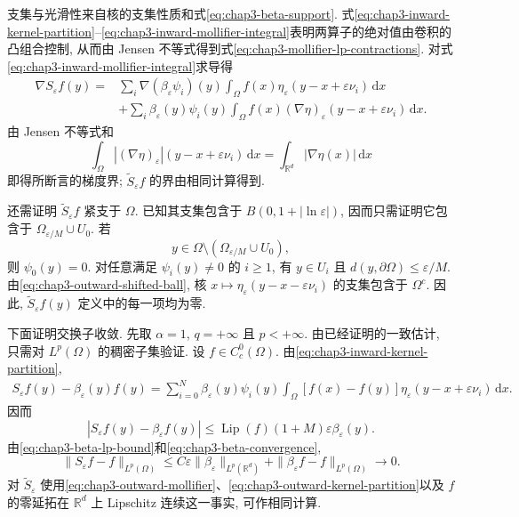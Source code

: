 \begin{Proof}
支集与光滑性来自核的支集性质和式\eqref{eq:chap3-beta-support}. 式\eqref{eq:chap3-inward-kernel-partition}--\eqref{eq:chap3-inward-mollifier-integral}表明两算子的绝对值由卷积的凸组合控制, 从而由 Jensen 不等式得到式\eqref{eq:chap3-mollifier-lp-contractions}. 对式\eqref{eq:chap3-inward-mollifier-integral}求导得
\begin{equation}
 \begin{split}
 \nabla S_\varepsilon f(y)={}&\sum_i\nabla(\beta_\varepsilon\psi_i)(y)
 \int_\Omega f(x)\eta_\varepsilon(y-x+\varepsilon\nu_i)\,\mathrm dx\\
 &+\sum_i\beta_\varepsilon(y)\psi_i(y)
 \int_\Omega f(x)(\nabla\eta)_\varepsilon(y-x+\varepsilon\nu_i)\,\mathrm dx.
 \end{split}
 \label{eq:chap3-mollifier-gradient}
\end{equation}
由 Jensen 不等式和
\[
 \int_\Omega|(\nabla\eta)_\varepsilon|(y-x+\varepsilon\nu_i)\,\mathrm dx
 =\int_{\mathbb R^d}|\nabla\eta(x)|\,\mathrm dx
\]
即得所断言的梯度界; $\widetilde S_\varepsilon f$ 的界由相同计算得到.

还需证明 $\widetilde S_\varepsilon f$ 紧支于 $\Omega$. 已知其支集包含于 $B(0,1+|\ln\varepsilon|)$, 因而只需证明它包含于 $\Omega_{\varepsilon/M}\cup U_0$. 若
\[
 y\in\Omega\setminus(\Omega_{\varepsilon/M}\cup U_0),
\]
则 $\psi_0(y)=0$. 对任意满足 $\psi_i(y)\neq0$ 的 $i\geq1$, 有 $y\in U_i$ 且 $d(y,\partial\Omega)\leq\varepsilon/M$. 由\eqref{eq:chap3-outward-shifted-ball}, 核 $x\mapsto\eta_\varepsilon(y-x-\varepsilon\nu_i)$ 的支集包含于 $\Omega^c$. 因此, $\widetilde S_\varepsilon f(y)$ 定义中的每一项均为零.

下面证明交换子收敛. 先取 $\alpha=1$, $q=+\infty$ 且 $p<+\infty$. 由已经证明的一致估计, 只需对 $L^p(\Omega)$ 的稠密子集验证. 设 $f\in C_c^0(\Omega)$. 由\eqref{eq:chap3-inward-kernel-partition},
\[
\begin{aligned}
 S_\varepsilon f(y)-\beta_\varepsilon(y)f(y)
 =\sum_{i=0}^N\beta_\varepsilon(y)\psi_i(y)
 \int_\Omega[f(x)-f(y)]\eta_\varepsilon(y-x+\varepsilon\nu_i)\,\mathrm dx.
\end{aligned}
\]
因而
\[
 |S_\varepsilon f(y)-\beta_\varepsilon f(y)|
 \leq\operatorname{Lip}(f)(1+M)\varepsilon\beta_\varepsilon(y).
\]
由\eqref{eq:chap3-beta-lp-bound}和\eqref{eq:chap3-beta-convergence},
\[
 \|S_\varepsilon f-f\|_{L^p(\Omega)}
 \leq C\varepsilon\|\beta_\varepsilon\|_{L^p(\mathbb R^d)}
 +\|\beta_\varepsilon f-f\|_{L^p(\Omega)}\longrightarrow0.
\]
对 $\widetilde S_\varepsilon$ 使用\eqref{eq:chap3-outward-mollifier}、\eqref{eq:chap3-outward-kernel-partition}以及 $f$ 的零延拓在 $\mathbb R^d$ 上 Lipschitz 连续这一事实, 可作相同计算.


\end{Proof}
